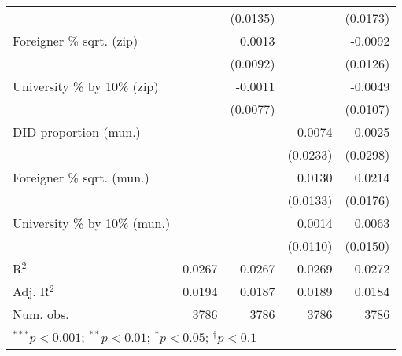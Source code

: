 \begin{tabular}{l D{.}{.}{4.7} D{.}{.}{4.7} D{.}{.}{4.7} D{.}{.}{4.7}}
                                  &               & (0.0135)      &               & (0.0173)      \\
Foreigner \% sqrt. (zip)          &               & 0.0013        &               & -0.0092       \\
                                  &               & (0.0092)      &               & (0.0126)      \\
University \% by 10\% (zip)       &               & -0.0011       &               & -0.0049       \\
                                  &               & (0.0077)      &               & (0.0107)      \\
DID proportion (mun.)             &               &               & -0.0074       & -0.0025       \\
                                  &               &               & (0.0233)      & (0.0298)      \\
Foreigner \% sqrt. (mun.)         &               &               & 0.0130        & 0.0214        \\
                                  &               &               & (0.0133)      & (0.0176)      \\
University \% by 10\% (mun.)      &               &               & 0.0014        & 0.0063        \\
                                  &               &               & (0.0110)      & (0.0150)      \\
\midrule
R$^2$                             & 0.0267        & 0.0267        & 0.0269        & 0.0272        \\
Adj. R$^2$                        & 0.0194        & 0.0187        & 0.0189        & 0.0184        \\
Num. obs.                         & 3786          & 3786          & 3786          & 3786          \\
\bottomrule
{}
\end{tabular}
